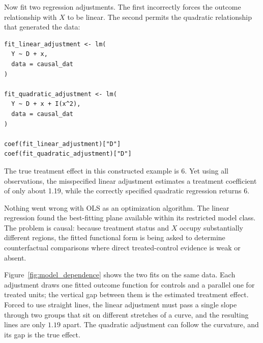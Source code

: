 \documentclass[11pt]{report}
\begin{document}
Now fit two regression adjustments. The first incorrectly forces the outcome relationship with \(X\) to be linear. The second permits the quadratic relationship that generated the data:

\begin{lstlisting}
fit_linear_adjustment <- lm(
  Y ~ D + x,
  data = causal_dat
)

fit_quadratic_adjustment <- lm(
  Y ~ D + x + I(x^2),
  data = causal_dat
)

coef(fit_linear_adjustment)["D"]
coef(fit_quadratic_adjustment)["D"]
\end{lstlisting}

The true treatment effect in this constructed example is 6. Yet using all observations, the misspecified linear adjustment estimates a treatment coefficient of only about 1.19, while the correctly specified quadratic regression returns 6.

Nothing went wrong with OLS as an optimization algorithm. The linear regression found the best-fitting plane available within its restricted model class. The problem is causal: because treatment status and \(X\) occupy substantially different regions, the fitted functional form is being asked to determine counterfactual comparisons where direct treated-control evidence is weak or absent.

Figure~\ref{fig:model_dependence} shows the two fits on the same data. Each adjustment draws one fitted outcome function for controls and a parallel one for treated units; the vertical gap between them is the estimated treatment effect. Forced to use straight lines, the linear adjustment must pass a single slope through two groups that sit on different stretches of a curve, and the resulting lines are only \(1.19\) apart. The quadratic adjustment can follow the curvature, and its gap is the true effect.
\end{document}
